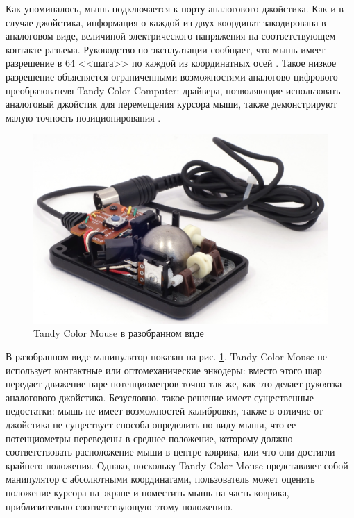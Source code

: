 \documentclass[11pt, a4paper]{article}
\begin{document}
Как упоминалось, мышь подключается к порту аналогового джойстика. Как и в случае джойстика, информация о каждой из двух координат закодирована в аналоговом виде, величиной электрического напряжения на соответствующем контакте разъема. Руководство по эксплуатации сообщает, что мышь имеет разрешение в 64 <<шага>> по каждой из координатных осей \cite{manual}. Такое низкое разрешение объясняется ограниченными возможностями аналогово-цифрового преобразователя Tandy Color Computer: драйвера, позволяющие использовать аналоговый джойстик для перемещения курсора мыши, также демонстрируют малую точность позиционирования \cite{hierophant}.

\begin{figure}[h]
    \centering
    \includegraphics[scale=0.8]{1984_tandy_trs80_color_mouse/inside_30.jpg}
    \caption{Tandy Color Mouse в разобранном виде}
    \label{fig:TandyColorMouseInside}
\end{figure}

В разобранном виде манипулятор показан на рис. \ref{fig:TandyColorMouseInside}. Tandy Color Mouse не использует контактные или оптомеханические энкодеры: вместо этого шар передает движение паре потенциометров точно так же, как это делает рукоятка аналогового джойстика. Безусловно, такое решение имеет существенные недостатки: мышь не имеет возможностей калибровки, также в отличие от джойстика не существует способа определить по виду мыши, что ее потенциометры переведены в среднее положение, которому должно соответствовать расположение мыши в центре коврика, или что они достигли крайнего положения. Однако, поскольку Tandy Color Mouse представляет собой манипулятор с абсолютными координатами, пользователь может оценить положение курсора на экране и поместить мышь на часть коврика, приблизительно соответствующую этому положению.
\end{document}
